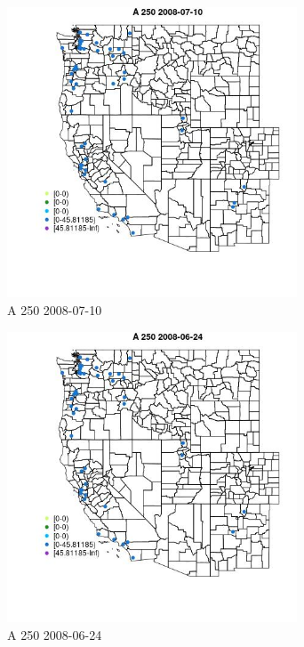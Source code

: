 \begin{figure} 
\centering  
\includegraphics[width=0.77\textwidth]{Code_Outputs/Report_ML_input_PM25_Step4_part_e_de_duplicated_aves_MapObsA_2502008-07-10.jpg} 
\caption{\label{fig:Report_ML_input_PM25_Step4_part_e_de_duplicated_avesMapObsA_2502008-07-10}A 250 2008-07-10} 
\end{figure} 
 

\begin{figure} 
\centering  
\includegraphics[width=0.77\textwidth]{Code_Outputs/Report_ML_input_PM25_Step4_part_e_de_duplicated_aves_MapObsA_2502008-06-24.jpg} 
\caption{\label{fig:Report_ML_input_PM25_Step4_part_e_de_duplicated_avesMapObsA_2502008-06-24}A 250 2008-06-24} 
\end{figure} 
 

